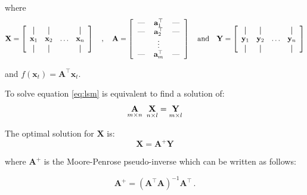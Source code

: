 \noindent where 
\begin{equation}
\label{eq:RRdefinitions}
\mathbf{X} = 
\left[
  \begin{array}{cccc}
    \vertbar & \vertbar &        & \vertbar \\
    \mathbf{x}_{1}    & \mathbf{x}_{2}    & \ldots & \mathbf{x}_{n}    \\
    \vertbar & \vertbar &        & \vertbar 
  \end{array}
\right]
\quad , \quad
\mathbf{A} = 
\left[
  \begin{tabular}{c>{$}c<{$}c}
    --- & \mathbf{a}^{\top}_{1} & ---\\
    --- & \mathbf{a}^{\top}_{2} & ---\\
    & \vdots & \\
    --- & \mathbf{a}^{\top}_{m} & ---
  \end{tabular}
\right]
\quad \text{and} \quad
\mathbf{Y} = 
\left[
  \begin{array}{cccc}
    \vertbar & \vertbar &        & \vertbar \\
    \mathbf{y}_{1}    & \mathbf{y}_{2}    & \ldots & \mathbf{y}_{n}    \\
    \vertbar & \vertbar &        & \vertbar 
  \end{array}
\right]
\end{equation}

\noindent and $f(\mathbf{x}_t)={\mathbf{A}}^\top {\mathbf{x}}_t$. 

To solve equation \ref{eq:lsm} is equivalent to find a solution of:
\begin{equation}
\label{eq:regproblem}
\underset{m \times n}{\mathbf{A}} \enskip \underset{n \times
l}{\mathbf{\mathbf{X}}} = \underset{m \times l}{\mathbf{Y}}
\end{equation}

The optimal solution for $\mathbf{\mathbf{X}}$ is:
\begin{equation}
\label{eq:MP}
\mathbf{\mathbf{X}}= \mathbf{A}^+ \mathbf{Y}
\end{equation}

\noindent where $\mathbf{A}^+$ is the Moore-Penrose pseudo-inverse
which can be written as follows: 

\begin{equation}
\label{eq:pseudoinverse}
\mathbf{A}^+= (\mathbf{A}^\top \mathbf{A})^{-1}\mathbf{A}^\top \, .
\end{equation}


